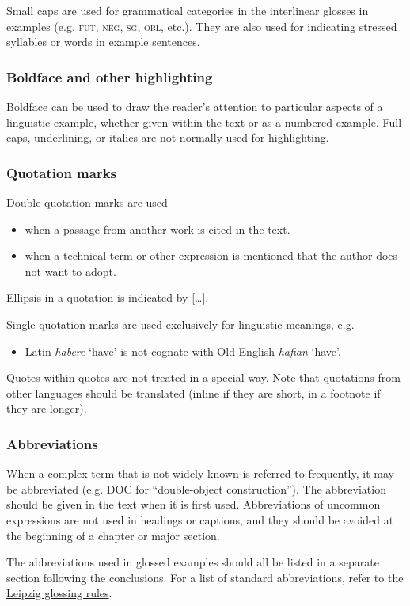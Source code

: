 \documentclass[charis,linguex]{glossa}
\begin{document}
Small caps are used for grammatical categories in the interlinear glosses in examples (e.g. \textsc{fut, neg, sg, obl}, etc.). They are also used for indicating stressed syllables or words in example sentences. 

\subsubsection{Boldface and other highlighting}
Boldface can be used to draw the reader’s attention to particular aspects of a linguistic example, whether given within the text or as a numbered example. Full caps, underlining, or italics are not normally used for highlighting.

\subsubsection{Quotation marks}
Double quotation marks are used

\begin{itemize}
\item when a passage from another work is cited in the text.
\item when a technical term or other expression is mentioned that the author does not want to adopt.
\end{itemize}
Ellipsis in a quotation is indicated by [\ldots].

Single quotation marks are used exclusively for linguistic meanings, e.g.
\begin{itemize}
\item Latin \textit{habere} ‘have’ is not cognate with Old English \textit{hafian} ‘have’.
\end{itemize}
Quotes within quotes are not treated in a special way.
Note that quotations from other languages should be translated (inline if they are short, in a footnote if they are longer).

\subsubsection{Abbreviations}
When a complex term that is not widely known is referred to frequently, it may be abbreviated (e.g. DOC for ``double-object construction''). The abbreviation should be given in the text when it is first used. Abbreviations of uncommon expressions are not used in headings or captions, and they should be avoided at the beginning of a chapter or major section.

The abbreviations used in glossed examples should all be listed in a separate section following the conclusions. For a list of standard abbreviations, refer to the \href{https://www.eva.mpg.de/lingua/resources/glossing-rules.php}{Leipzig glossing rules}. 
\end{document}
